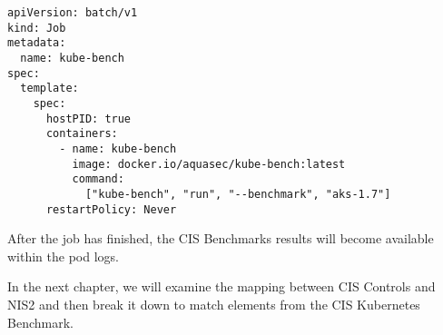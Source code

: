 \pagebreak

\begin{lstlisting}[caption=Kube-bench Job, frame=single, basicstyle=\ttfamily]
apiVersion: batch/v1
kind: Job
metadata:
  name: kube-bench
spec:
  template:
    spec:
      hostPID: true
      containers:
        - name: kube-bench
          image: docker.io/aquasec/kube-bench:latest
          command:
            ["kube-bench", "run", "--benchmark", "aks-1.7"]
      restartPolicy: Never            
\end{lstlisting}

After the job has finished, the CIS Benchmarks results will become available within the pod logs.

In the next chapter, we will examine the mapping between CIS Controls and NIS2 and then break it down to match elements from the CIS Kubernetes Benchmark.
